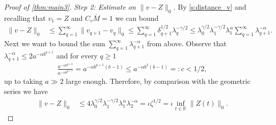 \documentclass[10pt,a4paper]{amsart}
\numberwithin{equation}{section}
\numberwithin{corollario}{section}
\numberwithin{lemma}{section}
\numberwithin{prop}{section}
\theoremstyle{definition}
\theoremstyle{remark}
\newcommand{\R}{\mathbb{R}}
\newcommand{\qq}{_{q+1}}
\begin{document}
\begin{proof}[Proof of \autoref{thm:main3}]
\textit{Step 2: Estimate on $\|v-Z\|_0$.}
By \eqref{s:distance_v} and recalling that $v_1 = Z$ and $C_v\overline{M}=1$ we can bound
\begin{align}
   \|v-Z\|_{0}
   &\leq
   \sum_{q=1}^\infty
   \|v_{q+1}-v_q\|_{0}
   \leq
   \sum_{q=1}^\infty \delta\qq^{1/2} \lambda_q^{-\gamma/2}
   \leq 
   \lambda_0^{\gamma/2} \lambda_1^{-\gamma/2} \lambda_1^{\alpha} \sum_{q=1}^\infty \lambda\qq^{-\alpha}.
\end{align}
Next we want to bound the sum $\sum_{q=1}^\infty \lambda\qq^{-\alpha}$ from above. Observe that $\lambda\qq^{-\alpha} \leq 2 a^{-\alpha b^{q+1}}$ and for every $q \geq 1$
\begin{align}
    \frac{ a^{-\alpha b^{q+2}}}{a^{-\alpha b^{q+1}}}
    =
    a^{-\alpha b^{q+1}(b-1)}
    \leq
    a^{-\alpha b^2(b-1)}
    =: c
    < 1/2,
\end{align}
up to taking $a \gg 2$ large enough.
Therefore, by comparison with the geometric series we have
\begin{align} \label{eq:estimate.v-Z}
    \|v-Z\|_{0}
   &\leq
   4 
   \lambda_0^{\gamma/2} \lambda_1^{-\gamma/2} \lambda_1^{\alpha} \lambda_2^{-\alpha}
   = \iota \zeta^{1/2} = \iota \inf_{t \in \R} \|Z(t)\|_0.
\end{align}





\end{proof}
\end{document}
